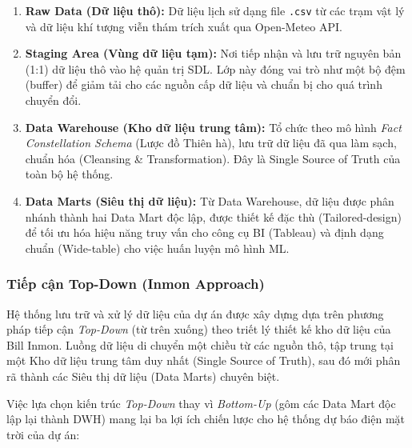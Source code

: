 \documentclass[12pt,a4paper]{article}
\begin{document}
\begin{enumerate}
    \item \textbf{Raw Data (Dữ liệu thô):} Dữ liệu lịch sử dạng file \texttt{.csv} từ các trạm vật lý và dữ liệu khí tượng viễn thám trích xuất qua Open-Meteo API.
    \item \textbf{Staging Area (Vùng dữ liệu tạm):} Nơi tiếp nhận và lưu trữ nguyên bản (1:1) dữ liệu thô vào hệ quản trị SDL. Lớp này đóng vai trò như một bộ đệm (buffer) để giảm tải cho các nguồn cấp dữ liệu và chuẩn bị cho quá trình chuyển đổi.
    \item \textbf{Data Warehouse (Kho dữ liệu trung tâm):} Tổ chức theo mô hình \textit{Fact Constellation Schema} (Lược đồ Thiên hà), lưu trữ dữ liệu đã qua làm sạch, chuẩn hóa (Cleansing \& Transformation). Đây là Single Source of Truth của toàn bộ hệ thống.
    \item \textbf{Data Marts (Siêu thị dữ liệu):} Từ Data Warehouse, dữ liệu được phân nhánh thành hai Data Mart độc lập, được thiết kế đặc thù (Tailored-design) để tối ưu hóa hiệu năng truy vấn cho công cụ BI (Tableau) và định dạng chuẩn (Wide-table) cho việc huấn luyện mô hình ML.
\end{enumerate}

\subsubsection{Tiếp cận Top-Down (Inmon Approach)}
\label{subsec:top_down_rationale}

Hệ thống lưu trữ và xử lý dữ liệu của dự án được xây dựng dựa trên phương pháp tiếp cận \textit{Top-Down} (từ trên xuống) theo triết lý thiết kế kho dữ liệu của Bill Inmon. Luồng dữ liệu di chuyển một chiều từ các nguồn thô, tập trung tại một Kho dữ liệu trung tâm duy nhất (Single Source of Truth), sau đó mới phân rã thành các Siêu thị dữ liệu (Data Marts) chuyên biệt. 

Việc lựa chọn kiến trúc \textit{Top-Down} thay vì \textit{Bottom-Up} (gôm các Data Mart độc lập lại thành DWH) mang lại ba lợi ích chiến lược cho hệ thống dự báo điện mặt trời của dự án:
\end{document}
